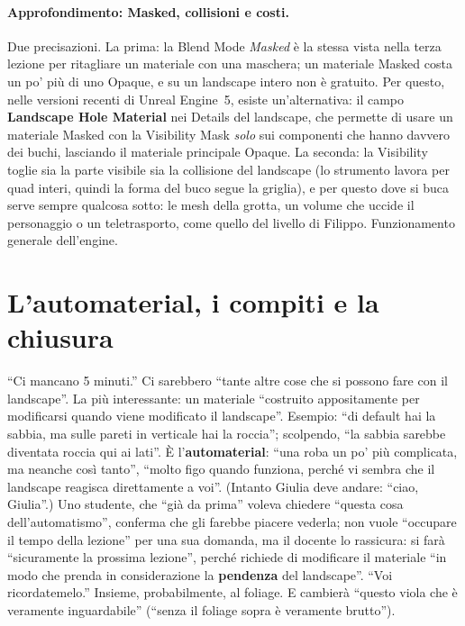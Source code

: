 \paragraph{Approfondimento: Masked, collisioni e costi.} Due precisazioni. La prima: la
Blend Mode \emph{Masked} è la stessa vista nella terza lezione per ritagliare un materiale
con una maschera; un materiale Masked costa un po' più di uno Opaque, e su un landscape
intero non è gratuito. Per questo, nelle versioni recenti di Unreal Engine~5, esiste
un'alternativa: il campo \textbf{Landscape Hole Material} nei Details del landscape, che
permette di usare un materiale Masked con la Visibility Mask \emph{solo} sui componenti che
hanno davvero dei buchi, lasciando il materiale principale Opaque. La seconda: la
Visibility toglie sia la parte visibile sia la collisione del landscape (lo strumento lavora
per quad interi, quindi la forma del buco segue la griglia), e per questo dove si buca
serve sempre qualcosa sotto: le mesh della grotta, un volume che uccide il personaggio o un
teletrasporto, come quello del livello di Filippo. Funzionamento generale dell'engine.

\section{L'automaterial, i compiti e la chiusura}
\label{ue14:sec:chiusura}

``Ci mancano 5 minuti.'' Ci sarebbero ``tante altre cose che si possono fare con il
landscape''. La più interessante: un materiale ``costruito appositamente per modificarsi
quando viene modificato il landscape''. Esempio: ``di default hai la sabbia, ma sulle pareti
in verticale hai la roccia''; scolpendo, ``la sabbia sarebbe diventata roccia qui ai lati''. È
l'\textbf{automaterial}: ``una roba un po' più complicata, ma neanche così tanto'', ``molto
figo quando funziona, perché vi sembra che il landscape reagisca direttamente a voi''.
(Intanto Giulia deve andare: ``ciao, Giulia''.) Uno studente, che ``già da prima'' voleva
chiedere ``questa cosa dell'automatismo'', conferma che gli farebbe piacere vederla; non vuole
``occupare il tempo della lezione'' per una sua domanda, ma il docente lo rassicura: si farà
``sicuramente la prossima lezione'', perché richiede di modificare il materiale ``in modo che
prenda in considerazione la \textbf{pendenza} del landscape''. ``Voi ricordatemelo.'' Insieme,
probabilmente, al foliage. E cambierà ``questo viola che è veramente inguardabile'' (``senza il
foliage sopra è veramente brutto'').

